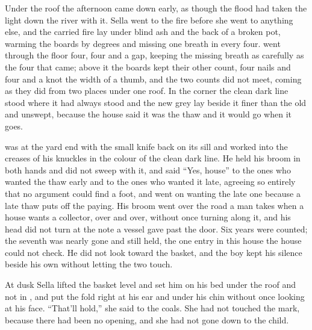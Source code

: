 \scenebreak

Under the roof the afternoon came down early, as though the flood had taken the light down the river with it. Sella went to the fire before she went to anything else, and the carried fire lay under blind ash and the back of a broken pot, warming the boards by degrees and missing one breath in every four.  went through the floor four, four and a gap, keeping the missing breath as carefully as the four that came; above it the boards kept their other count, four nails and four and a knot the width of a thumb, and the two counts did not meet, coming as they did from two places under one roof. In the corner the clean dark line stood where it had always stood and the new grey lay beside it finer than the old and unswept, because the house said it was the thaw and it would go when it goes.

 was at the yard end with the small knife back on its sill and  worked into the creases of his knuckles in the colour of the clean dark line. He held his broom in both hands and did not sweep with it, and said “Yes, house” to the ones who wanted the thaw early and to the ones who wanted it late, agreeing so entirely that no argument could find a foot, and went on wanting the late one because a late thaw puts off the paying. His broom went over the road a man takes when a house wants a collector, over and over, without once turning along it, and his head did not turn at the note a vessel gave past the door. Six years were counted; the seventh was nearly gone and still held, the one entry in this house the house could not check. He did not look toward the basket, and the boy kept his silence beside his own without letting the two touch.

At dusk Sella lifted the basket level and set him on his bed under the roof and not in , and put the fold right at his ear and under his chin without once looking at his face. “That'll hold,” she said to the coals. She had not touched the mark, because there had been no opening, and she had not gone down to the child.

